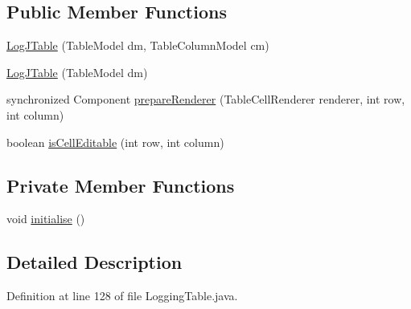 \subsection*{Public Member Functions}
\begin{DoxyCompactItemize}
\item 
\hyperlink{classit_1_1emarolab_1_1cagg_1_1debugging_1_1baseComponents_1_1LoggingTable_1_1LogJTable_a73b59150e0593dfe18c9e652d8b05e69}{Log\-J\-Table} (Table\-Model dm, Table\-Column\-Model cm)
\item 
\hyperlink{classit_1_1emarolab_1_1cagg_1_1debugging_1_1baseComponents_1_1LoggingTable_1_1LogJTable_ad472fe8c6246fd47bddf6dbd8377907a}{Log\-J\-Table} (Table\-Model dm)
\item 
synchronized Component \hyperlink{classit_1_1emarolab_1_1cagg_1_1debugging_1_1baseComponents_1_1LoggingTable_1_1LogJTable_ac30a43b4223130c24ae8c4326c09cf67}{prepare\-Renderer} (Table\-Cell\-Renderer renderer, int row, int column)
\item 
boolean \hyperlink{classit_1_1emarolab_1_1cagg_1_1debugging_1_1baseComponents_1_1LoggingTable_1_1LogJTable_add41fd43a972e63fb5b49c094e61f210}{is\-Cell\-Editable} (int row, int column)
\end{DoxyCompactItemize}
\subsection*{Private Member Functions}
\begin{DoxyCompactItemize}
\item 
void \hyperlink{classit_1_1emarolab_1_1cagg_1_1debugging_1_1baseComponents_1_1LoggingTable_1_1LogJTable_aac504be59ed969e17671a3bc2d0e69a6}{initialise} ()
\end{DoxyCompactItemize}


\subsection{Detailed Description}


Definition at line 128 of file Logging\-Table.\-java.



